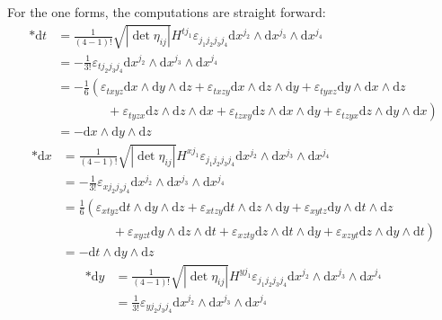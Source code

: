 \documentclass[12pt,a4]{article}
\newcommand{\e}{\mathrm{d}}
\begin{document}
\begin{enumerate}
\begin{enumerate}
\begin{equation*}
        \end{equation*}
        For the one forms, the computations are straight forward:
        \begin{align*}
          *\e t
                 &= \frac{1}{(4 - 1)!} \sqrt{|\det{\eta_{ij}}|} H^{t j_1} \varepsilon_{j_1 j_2 j_3 j_4} \e x^{j_2} \wedge \e x^{j_3} \wedge \e x^{j_4}\\
                 &= - \frac{1}{3!}  \varepsilon_{t j_2 j_3 j_4} \e x^{j_2} \wedge \e x^{j_3} \wedge \e x^{j_4}\\
                 &= - \frac{1}{6}  \left(\varepsilon_{t x y z} \e x \wedge \e y \wedge \e z + \varepsilon_{t x z y} \e x \wedge \e z \wedge \e y + \varepsilon_{t y x z} \e y \wedge \e x \wedge \e z\right.\\
                 &\qquad \qquad +\left. \varepsilon_{t y z x} \e z \wedge \e z \wedge \e x + \varepsilon_{t z x y} \e z \wedge \e x \wedge \e y + \varepsilon_{t z y x} \e z \wedge \e y \wedge \e x\right)\\
                 &= -  \e x \wedge \e y \wedge \e z
        \end{align*}
        \begin{align*}
          *\e x
                 &= \frac{1}{(4 - 1)!} \sqrt{|\det{\eta_{ij}}|} H^{x j_1} \varepsilon_{j_1 j_2 j_3 j_4} \e x^{j_2} \wedge \e x^{j_3} \wedge \e x^{j_4}\\
                 &= - \frac{1}{3!}  \varepsilon_{x j_2 j_3 j_4} \e x^{j_2} \wedge \e x^{j_3} \wedge \e x^{j_4}\\
                 &= \frac{1}{6}  \left(\varepsilon_{x t y z} \e t \wedge \e y \wedge \e z + \varepsilon_{x t z y} \e t \wedge \e z \wedge \e y + \varepsilon_{x y t z} \e y \wedge \e t \wedge \e z\right.\\
                 &\qquad \qquad +\left. \varepsilon_{x y z t} \e y \wedge \e z \wedge \e t + \varepsilon_{x z t y} \e z \wedge \e t \wedge \e y + \varepsilon_{x z y t} \e z \wedge \e y \wedge \e t\right)\\
                 &= -  \e t \wedge \e y \wedge \e z
        \end{align*}
        \begin{align*}
          *\e y
                 &= \frac{1}{(4 - 1)!} \sqrt{|\det{\eta_{ij}}|} H^{y j_1} \varepsilon_{j_1 j_2 j_3 j_4} \e x^{j_2} \wedge \e x^{j_3} \wedge \e x^{j_4}\\
                 &= \frac{1}{3!}  \varepsilon_{y j_2 j_3 j_4} \e x^{j_2} \wedge \e x^{j_3} \wedge \e x^{j_4}\\

\end{align*}
\end{enumerate}
\end{enumerate}
\end{document}

